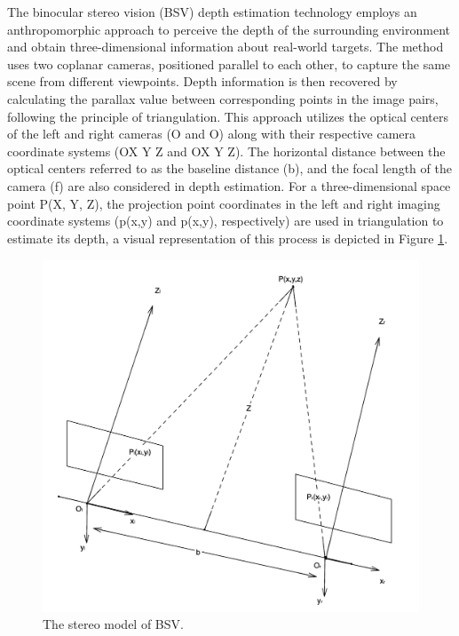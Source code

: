 \documentclass[english, LaM, oneside]{sapthesis}%
\begin{document}
The binocular stereo vision (BSV) depth estimation technology employs an anthropomorphic approach to perceive the depth of the surrounding environment and obtain three-dimensional information about real-world targets. The method uses two coplanar cameras, positioned parallel to each other, to capture the same scene from different viewpoints. Depth information is then recovered by calculating the parallax value between corresponding points in the image pairs, following the principle of triangulation. This approach utilizes the optical centers of the left and right cameras (O and O) along with their respective camera coordinate systems (O\textendash X Y Z and O\textendash X Y Z)\cite{ref:s3}. The horizontal distance between the optical centers referred to as the baseline distance (b), and the focal length of the camera (f) are also considered in depth estimation. For a three-dimensional space point P(X, Y, Z), the projection point coordinates in the left and right imaging coordinate systems (p(x,y) and p(x,y), respectively) are used in triangulation to estimate its depth, a visual representation of this process is depicted in Figure \ref{fig:stereo depth}\cite{ref:s3}.

\begin{figure}[h]
    \centering
    \includegraphics[width=\linewidth]{Images/depth.png}
    \caption{The stereo model of BSV.}
    \label{fig:stereo depth}
\end{figure}
\end{document}
